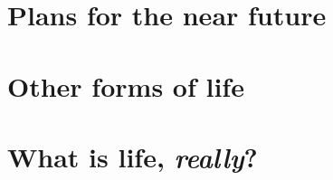 \documentclass[DIV=calc, paper=a4, fontsize=12pt]{scrartcl}	 %
\begin{document}
{\begin{multicols}{2}



\end{multicols} \noindent\makebox[\linewidth]{\rule{\paperwidth}{0.4pt}}




\section{Plans for the near future}

\begin{multicols}{2}






\end{multicols} \noindent\makebox[\linewidth]{\rule{\paperwidth}{0.4pt}}

\section{Other forms of life}

\begin{multicols}{2}



\end{multicols} \noindent\makebox[\linewidth]{\rule{\paperwidth}{0.4pt}}


\section*{What is life, \textit{really}?}

\begin{multicols}{2}






\end{multicols}}
\end{document}
